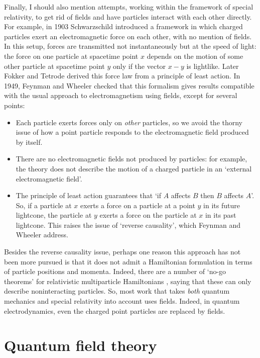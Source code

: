 \documentclass[12pt]{article}
\begin{document}
Finally, I should also mention attempts, working within the framework of special relativity, to get rid of fields and have particles interact with each other directly.  For example, in 1903 Schwarzschild \cite{Schwarzschild} introduced a framework in which charged particles exert an electromagnetic force on each other, with no mention of fields.  In this setup, forces are transmitted not instantaneously but at the speed of light: the force on one particle at spacetime point $x$ depends on the motion of some other particle at spacetime point $y$ only if the vector $x - y$ is lightlike.  Later Fokker and Tetrode \cite{Fokker,Tetrode} derived this force law from a principle of least action.  In 1949, Feynman and Wheeler checked that this formalism gives results compatible with the usual approach to electromagnetism using fields, except for several points:
\begin{itemize}
\item Each particle exerts forces only on \emph{other} particles, so we avoid the thorny issue of how a point particle responds to the electromagnetic field produced by itself.
\item There are no electromagnetic fields not produced by particles: for example, the theory does not describe the motion of a charged particle in an `external electromagnetic
field'.
\item The principle of least action guarantees that `if $A$ affects $B$ then $B$ affects
$A$'.  So, if a particle at $x$ exerts a force on a particle at a point $y$ in its future lightcone, the particle at $y$ exerts a force on the particle at $x$ in its past lightcone.  This raises the issue of `reverse causality', which Feynman and Wheeler address.
\end{itemize}
Besides the reverse causality issue, perhaps one reason this approach has 
not been more pursued is that it does not admit a Hamiltonian formulation in terms
of particle positions and momenta.  Indeed, there are a number of `no-go theorems' for relativistic multiparticle Hamiltonians \cite{CJS,Leutwyler}, saying that these can only 
describe noninteracting particles.   So, most work that takes \emph{both} quantum mechanics and special relativity into account uses fields.  Indeed, in quantum electrodynamics, even the charged point particles are replaced by fields.

\section{Quantum field theory}
\label{qft}
\end{document}
